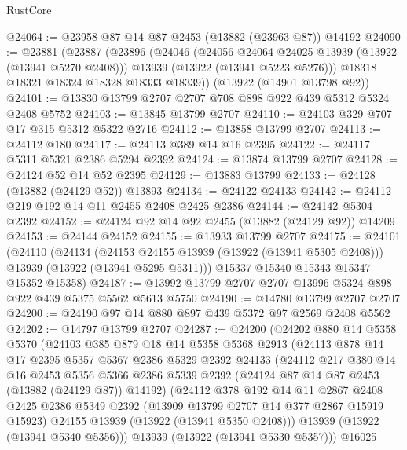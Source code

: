 \begin{lexlean}{RustCore}
\begin{coremodule}
@24064 := @23958 @87 @14 @87 @2453 (@13882 (@23963 @87)) @14192
@24090 := @23881
    (@23887
      (@23896
        (@24046
          (@24056 @24064 @24025 @13939 (@13922 (@13941 @5270 @2408)))
          @13939
          (@13922 (@13941 @5223 @5276)))
        @18318
        @18321
        @18324
        @18328
        @18333
        @18339))
    (@13922 (@14901 @13798 @92))
@24101 := @13830 @13799 @2707 @2707 @708 @898 @922 @439 @5312 @5324 @2408 @5752
@24103 := @13845 @13799 @2707
@24110 := @24103 @329 @707 @17 @315 @5312 @5322 @2716
@24112 := @13858 @13799 @2707
@24113 := @24112 @180
@24117 := @24113 @389 @14 @16 @2395
@24122 := @24117 @5311 @5321 @2386 @5294 @2392
@24124 := @13874 @13799 @2707
@24128 := @24124 @52 @14 @52 @2395
@24129 := @13883 @13799
@24133 := @24128 (@13882 (@24129 @52)) @13893
@24134 := @24122 @24133
@24142 := @24112 @219 @192 @14 @11 @2455 @2408 @2425 @2386
@24144 := @24142 @5304 @2392
@24152 := @24124 @92 @14 @92 @2455 (@13882 (@24129 @92)) @14209
@24153 := @24144 @24152
@24155 := @13933 @13799 @2707
@24175 := @24101
    (@24110
      (@24134
        (@24153 @24155 @13939 (@13922 (@13941 @5305 @2408)))
        @13939
        (@13922 (@13941 @5295 @5311)))
      @15337
      @15340
      @15343
      @15347
      @15352
      @15358)
@24187 := @13992 @13799 @2707 @2707 @13996 @5324 @898 @922 @439 @5375 @5562 @5613 @5750
@24190 := @14780 @13799 @2707 @2707
@24200 := @24190 @97 @14 @880 @897 @439 @5372 @97 @2569 @2408 @5562
@24202 := @14797 @13799 @2707
@24287 := @24200
    (@24202
      @880
      @14
      @5358
      @5370
      (@24103
        @385
        @879
        @18
        @14
        @5358
        @5368
        @2913
        (@24113
          @878
          @14
          @17
          @2395
          @5357
          @5367
          @2386
          @5329
          @2392
          @24133
          (@24112
            @217
            @380
            @14
            @16
            @2453
            @5356
            @5366
            @2386
            @5339
            @2392
            (@24124 @87 @14 @87 @2453 (@13882 (@24129 @87)) @14192)
            (@24112
              @378
              @192
              @14
              @11
              @2867
              @2408
              @2425
              @2386
              @5349
              @2392
              (@13909 @13799 @2707 @14 @377 @2867 @15919 @15923)
              @24155
              @13939
              (@13922 (@13941 @5350 @2408)))
            @13939
            (@13922 (@13941 @5340 @5356)))
          @13939
          (@13922 (@13941 @5330 @5357)))
        @16025

\end{coremodule}
\end{lexlean}
